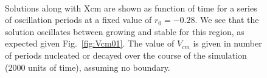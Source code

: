\documentclass[pre,preprint,superscriptaddress]{revtex4-1}
\begin{document}
 \begin{figure}[!htb]
  \begin{center}
        \mbox{
	\quad 
      } \mbox{
	\quad
      }
    \caption{Solutions along with Xcm are shown as  function of time for a series of oscillation periods at a fixed value of $r_0=-0.28$.  We see that the solution oscillates between growing and stable for this region, as expected given Fig.~\ref{fig:Vcm01}.  The value of $V_{cm}$ is given in number of periods nucleated or decayed over the course of the simulation (2000 units of time), assuming no boundary.}
    \label{fig:r28slice2}
  \end{center}
\end{figure} 
\end{document}
